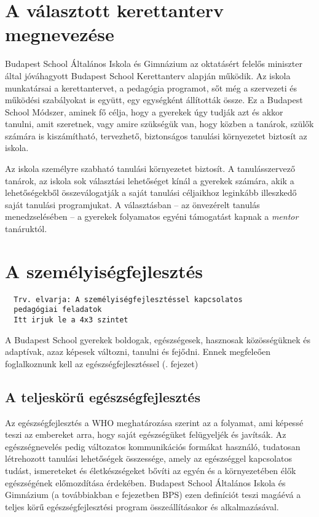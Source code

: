 \section{A választott kerettanterv
  megnevezése}

Budapest School Általános Iskola és Gimnázium az oktatásért felelős
miniszter által jóváhagyott Budapest School Kerettanterv alapján
működik. Az iskola munkatársai a kerettantervet, a pedagógia programot,
sőt még a szervezeti és működési szabályokat is együtt, egy egységként
állították össze. Ez a Budapest School Módszer, aminek fő célja, hogy a
gyerekek úgy tudják azt és akkor tanulni, amit szeretnek, vagy amire
szükségük van, hogy közben a tanárok, szülők számára is kiszámítható,
tervezhető, biztonságos tanulási környezetet biztosít az iskola.

Az iskola személyre szabható tanulási környezetet biztosít. A
tanulásszervező tanárok, az iskola sok választási lehetőséget kínál a
gyerekek számára, akik a lehetőségekből összeválogatják a saját tanulási
céljaikhoz leginkább illeszkedő saját tanulási programjukat. A
választásban -- az önvezérelt tanulás menedzselésében -- a gyerekek
folyamatos egyéni támogatást kapnak a \emph{mentor} tanáruktól.

\section{A személyiségfejlesztés}
\begin{verbatim}
  Trv. elvarja: A személyiségfejlesztéssel kapcsolatos
  pedagógiai feladatok
  Itt irjuk le a 4x3 szintet
\end{verbatim}

A Budapest School gyerekek boldogak, egészségesek, hasznosak közösségüknek és
adaptívak, azaz képesek változni, tanulni és fejődni. Ennek megfeleően
foglalkoznunk kell az egészségfejlesztéssel (.
fejezet)

\subsection{A teljeskörű
      egészségfejlesztés}\label{sec:egeszsegfejlesztes}

Az egészségfejlesztés a WHO meghatározása szerint az a folyamat, ami
képessé teszi az embereket arra, hogy saját egészségüket felügyeljék és
javítsák. Az egészségnevelés pedig változatos kommunikációs formákat
használó, tudatosan létrehozott tanulási lehetőségek összessége, amely
az egészséggel kapcsolatos tudást, ismereteket és életkészségeket bővíti
az egyén és a környezetében élők egészségének előmozdítása érdekében.
Budapest School Általános Iskola és Gimnázium (a továbbiakban e
fejezetben BPS) ezen definíciót teszi magáévá a teljes körű
egészségfejlesztési program összeállításakor és alkalmazásával.

